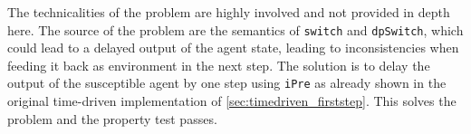 The technicalities of the problem are highly involved and not provided in depth here. The source of the problem are the semantics of \texttt{switch} and \texttt{dpSwitch}, which could lead to a delayed output of the agent state, leading to inconsistencies when feeding it back as environment in the next step. The solution is to delay the output of the susceptible agent by one step using \texttt{iPre} as already shown in the original time-driven implementation of \ref{sec:timedriven_firststep}. This solves the problem and the property test passes. 

%
%
%
